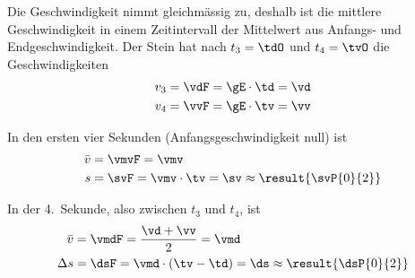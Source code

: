 Die Geschwindigkeit nimmt gleichmässig zu, deshalb ist die mittlere Geschwindigkeit in einem Zeitintervall der Mittelwert aus Anfangs- und Endgeschwindigkeit. Der Stein hat nach $t_3 = \tdO$ und $t_4 = \tvO$ die Geschwindigkeiten
\begin{align}
 v_3 &= \vdF = \gE\cdot\td = \vd \\
 v_4 &= \vvF = \gE\cdot\tv = \vv
\end{align}

In den ersten vier Sekunden (Anfangsgeschwindigkeit null) ist
\begin{align}
 \bar v &= \vmvF = \vmv \\
 s &= \svF = \vmv\cdot\tv = \sv \approx \result{\svP{0}{2}}
\end{align}

In der 4.~Sekunde, also zwischen $t_3$ und $t_4$, ist
\begin{align}
 \bar v &= \vmdF = \frac{\vd+\vv}{2} = \vmd \\
 \Delta s &= \dsF = \vmd\cdot\left(\tv-\td\right) = \ds \approx \result{\dsP{0}{2}}
\end{align}
